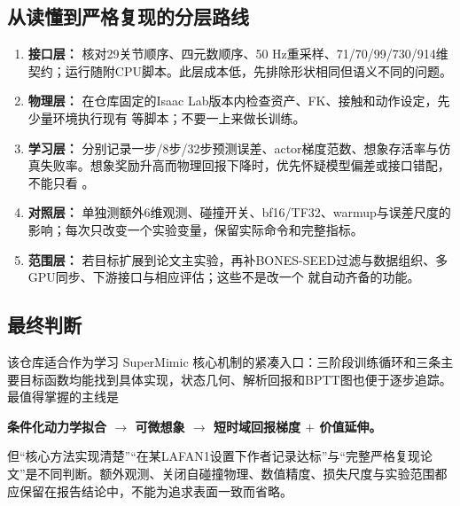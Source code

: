 \subsection{从读懂到严格复现的分层路线}
\begin{enumerate}
\item \textbf{接口层：} 核对29关节顺序、四元数顺序、50 Hz重采样、71/70/99/730/914维契约；运行随附CPU脚本。此层成本低，先排除形状相同但语义不同的问题。
\item \textbf{物理层：} 在仓库固定的Isaac Lab版本内检查资产、FK、接触和动作设定，先少量环境执行现有  等脚本；不要一上来做长训练。
\item \textbf{学习层：} 分别记录一步/8步/32步预测误差、actor梯度范数、想象存活率与仿真失败率。想象奖励升高而物理回报下降时，优先怀疑模型偏差或接口错配，不能只看 。
\item \textbf{对照层：} 单独测额外6维观测、碰撞开关、bf16/TF32、warmup与误差尺度的影响；每次只改变一个实验变量，保留实际命令和完整指标。
\item \textbf{范围层：} 若目标扩展到论文主实验，再补BONES-SEED过滤与数据组织、多GPU同步、下游接口与相应评估；这些不是改一个  就自动齐备的功能。
\end{enumerate}

\subsection{最终判断}
该仓库适合作为学习 SuperMimic 核心机制的紧凑入口：三阶段训练循环和三条主要目标函数均能找到具体实现，状态几何、解析回报和BPTT图也便于逐步追踪。最值得掌握的主线是
\begin{center}
\textbf{条件化动力学拟合 $\rightarrow$ 可微想象 $\rightarrow$ 短时域回报梯度 $+$ 价值延伸。}
\end{center}
但“核心方法实现清楚”“在某LAFAN1设置下作者记录达标”与“完整严格复现论文”是不同判断。额外观测、关闭自碰撞物理、数值精度、损失尺度与实验范围都应保留在报告结论中，不能为追求表面一致而省略。
